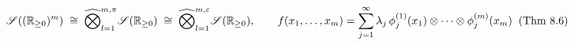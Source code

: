 \documentclass[preview]{standalone}
\begin{document}
\begin{align*}
\special{dvisvgm:raw <g id='unique000'>}\mathscr{S}\!\left((\mathbb{R}_{\ge 0})^m\right) \;\cong\; \widehat{\bigotimes}_{l=1}^{m,\pi} \mathscr{S}(\mathbb{R}_{\ge 0}) \;\cong\; \widehat{\bigotimes}_{l=1}^{m,\varepsilon} \mathscr{S}(\mathbb{R}_{\ge 0}), \qquad f(x_1,\dots,x_m) = \sum_{j=1}^\infty \lambda_j\,\phi_j^{(1)}(x_1)\otimes\cdots\otimes\phi_j^{(m)}(x_m)\;\;(\text{Thm 8.6})\special{dvisvgm:raw </g>}
\end{align*}
\end{document}
